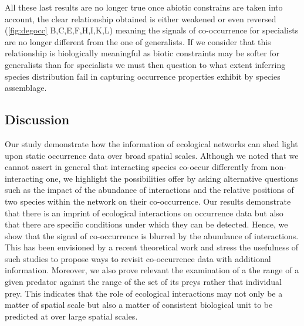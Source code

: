 All these last results are no longer true once abiotic constrains are
taken into account, the clear relationship obtained is either weakened
or even reversed (\ref{fig:degocc} B,C,E,F,H,I,K,L) meaning the signals
of co-occurrence for specialists are no longer different from the one of
generalists. If we consider that this relationship is biologically
meaningful as biotic constraints may be softer for generalists than for
specialists we must then question to what extent inferring species
distribution fail in capturing occurrence properties exhibit by species
assemblage.

\subsection{Discussion}\label{discussion}

Our study demonstrate how the information of ecological networks can
shed light upon static occurrence data over broad spatial scales.
Although we noted that we cannot assert in general that interacting
species co-occur differently from non-interacting one, we highlight the
possibilities offer by asking alternative questions such as the impact
of the abundance of interactions and the relative positions of two
species within the network on their co-occurrence. Our results
demonstrate that there is an imprint of ecological interactions on
occurrence data but also that there are specific conditions under which
they can be detected. Hence, we show that the signal of co-occurrence is
blurred by the abundance of interactions. This has been envisioned by a
recent theoretical work \citep{Cazelles2016} and stress the usefulness
of such studies to propose ways to revisit co-occurrence data with
additional information. Moreover, we also prove relevant the examination
of a the range of a given predator against the range of the set of its
preys rather that individual prey. This indicates that the role of
ecological interactions may not only be a matter of spatial scale
\citep{McGill2010} but also a matter of consistent biological unit to be
predicted at over large spatial scales.

